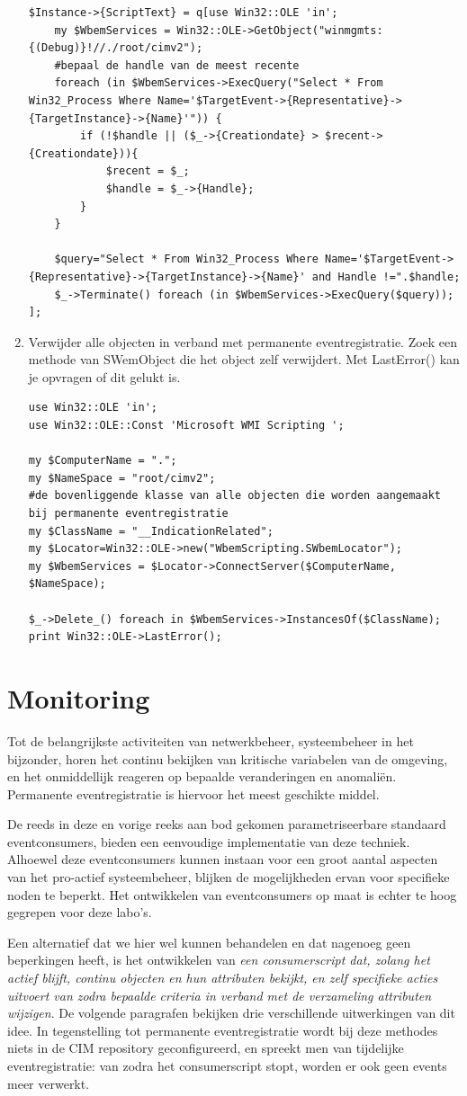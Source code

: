 \documentclass[11pt,a4paper]{report}
\begin{document}
\begin{enumerate}[resume]
\begin{lstlisting}
$Instance->{ScriptText} = q[use Win32::OLE 'in'; 
	my $WbemServices = Win32::OLE->GetObject("winmgmts:{(Debug)}!//./root/cimv2");
	#bepaal de handle van de meest recente
	foreach (in $WbemServices->ExecQuery("Select * From Win32_Process Where Name='$TargetEvent->{Representative}->{TargetInstance}->{Name}'")) {
		if (!$handle || ($_->{Creationdate} > $recent->{Creationdate})){
			$recent = $_;
			$handle = $_->{Handle};
		}
	}
	
	$query="Select * From Win32_Process Where Name='$TargetEvent->{Representative}->{TargetInstance}->{Name}' and Handle !=".$handle;
	$_->Terminate() foreach (in $WbemServices->ExecQuery($query));        
];
	\end{lstlisting}
	\newpage
	\item Verwijder alle objecten in verband met permanente eventregistratie. Zoek een methode van SWemObject die het object zelf verwijdert. Met LastError() kan je opvragen of dit gelukt is.
	\begin{lstlisting}
use Win32::OLE 'in';
use Win32::OLE::Const 'Microsoft WMI Scripting ';

my $ComputerName = ".";
my $NameSpace = "root/cimv2";
#de bovenliggende klasse van alle objecten die worden aangemaakt bij permanente eventregistratie
my $ClassName = "__IndicationRelated"; 
my $Locator=Win32::OLE->new("WbemScripting.SWbemLocator");
my $WbemServices = $Locator->ConnectServer($ComputerName, $NameSpace);

$_->Delete_() foreach in $WbemServices->InstancesOf($ClassName);
print Win32::OLE->LastError();
	\end{lstlisting}
\end{enumerate}
\section{Monitoring}
Tot de belangrijkste activiteiten van netwerkbeheer, systeembeheer in het bijzonder, horen het continu bekijken van kritische variabelen van de omgeving, en het onmiddellijk reageren op bepaalde veranderingen en anomaliën. Permanente eventregistratie is hiervoor het meest geschikte middel. 
\par De reeds in deze en vorige reeks aan bod gekomen parametriseerbare standaard eventconsumers, bieden een eenvoudige implementatie van deze techniek. Alhoewel deze eventconsumers kunnen instaan voor een groot aantal aspecten van het pro-actief systeembeheer, blijken de mogelijkheden ervan voor specifieke noden te beperkt. Het ontwikkelen van eventconsumers op maat is echter te hoog gegrepen voor deze labo's. 
\par Een alternatief dat we hier wel kunnen behandelen en dat nagenoeg geen beperkingen heeft, is het ontwikkelen van \textit{een consumerscript dat, zolang het actief blijft, continu objecten en hun attributen bekijkt, en zelf specifieke acties uitvoert van zodra bepaalde criteria in verband met de verzameling attributen wijzigen}. De volgende paragrafen bekijken drie verschillende uitwerkingen van dit idee. In tegenstelling tot permanente eventregistratie wordt bij deze methodes niets in de CIM repository geconfigureerd, en spreekt men van tijdelijke eventregistratie: van zodra het consumerscript stopt, worden er ook geen events meer verwerkt.
\end{document}
